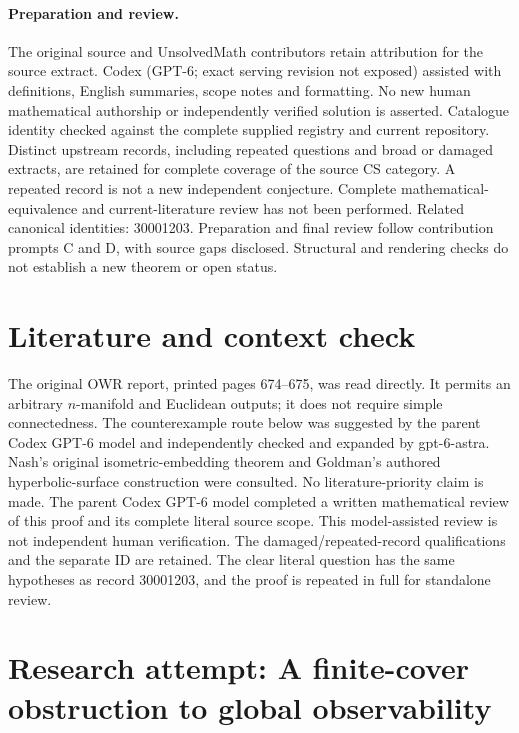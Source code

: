 \documentclass[11pt]{article}
\begin{document}
\paragraph{Preparation and review.}
The original source and UnsolvedMath contributors retain attribution for the source extract. Codex (GPT-6; exact serving revision not exposed) assisted with definitions, English summaries, scope notes and formatting. No new human mathematical authorship or independently verified solution is asserted. Catalogue identity checked against the complete supplied registry and current repository. Distinct upstream records, including repeated questions and broad or damaged extracts, are retained for complete coverage of the source CS category. A repeated record is not a new independent conjecture. Complete mathematical-equivalence and current-literature review has not been performed. Related canonical identities: 30001203. Preparation and final review follow contribution prompts C and D, with source gaps disclosed. Structural and rendering checks do not establish a new theorem or open status.
\label{end:statement}

\section{Literature and context check}
The original OWR report, printed pages 674--675, was read directly. It permits an arbitrary $n$-manifold and Euclidean outputs; it does not require simple connectedness. The counterexample route below was suggested by the parent Codex GPT-6 model and independently checked and expanded by gpt-6-astra. Nash's original isometric-embedding theorem and Goldman's authored hyperbolic-surface construction were consulted. No literature-priority claim is made. The parent Codex GPT-6 model completed a written mathematical review of this proof and its complete literal source scope. This model-assisted review is not independent human verification. The damaged/repeated-record qualifications and the separate ID are retained. The clear literal question has the same hypotheses as record 30001203, and the proof is repeated in full for standalone review.
\section{Research attempt: A finite-cover obstruction to global observability}
\end{document}
